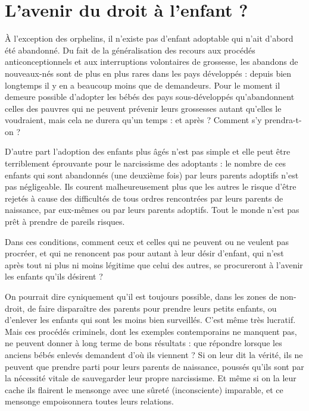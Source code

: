  
 


\chapter{L'avenir du droit à l'enfant ?}


 À l'exception des orphelins, il n'existe pas d'enfant adoptable qui n'ait d'abord été abandonné. Du fait de la généralisation des recours aux procédés anticonceptionnels et aux interruptions volontaires de grossesse, les abandons de nouveaux-nés sont de plus en plus rares dans les pays développés : depuis bien longtemps il y en a beaucoup moins que de demandeurs. Pour le moment il demeure possible d'adopter les bébés des pays sous-développés qu'abandonnent celles des pauvres qui ne peuvent prévenir leurs grossesses autant qu'elles le voudraient, mais cela ne durera qu'un temps : et après ? Comment s'y prendra-t-on ?
 
 D'autre part l'adoption des enfants plus âgés n'est pas simple et elle peut être terriblement éprouvante pour le narcissisme des adoptants : le nombre de ces enfants qui sont abandonnés (une deuxième fois) par leurs parents adoptifs n'est pas négligeable. Ils courent malheureusement plus que les autres le risque d'être rejetés à cause des difficultés de tous ordres rencontrées par leurs parents de naissance, par eux-mêmes ou par leurs parents adoptifs. Tout le monde n'est pas prêt à prendre de pareils risques.

 Dans ces conditions, comment ceux et celles qui ne peuvent ou ne veulent pas procréer, et qui ne renoncent pas pour autant à leur désir d'enfant, qui n'est après tout ni plus ni moins légitime que celui des autres, se procureront à l'avenir les enfants qu'ils désirent ? 

 On pourrait dire cyniquement qu'il est toujours possible, dans les zones de non-droit, de faire disparaître des parents pour prendre leurs petits enfants, ou d'enlever les enfants qui sont les moins bien surveillés. C'est même très lucratif. Mais ces procédés criminels, dont les exemples contemporains ne manquent pas, ne peuvent donner à long terme de bons résultats : que répondre lorsque les anciens bébés enlevés demandent d'où ils viennent ? Si on leur dit la vérité, ils ne peuvent que prendre parti pour leurs parents de naissance, poussés qu'ils sont par la nécessité vitale de sauvegarder leur propre narcissisme. Et même si on la leur cache ils flairent le mensonge avec une sûreté (inconsciente) imparable, et ce mensonge empoisonnera toutes leurs relations.

